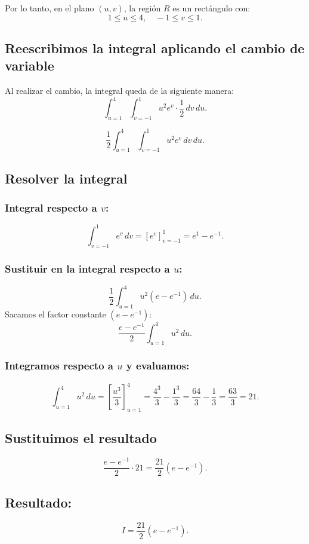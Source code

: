 \documentclass{article}
\begin{document}
Por lo tanto, en el plano \( (u, v) \), la región \( R \) es un rectángulo con:
	\[
	1 \leq u \leq 4, \quad -1 \leq v \leq 1.
	\]
	
	\subsection*{Reescribimos la integral aplicando el cambio de variable}
	Al realizar el cambio, la integral queda de la siguiente manera:
	\[
	 \int_{u=1}^{4} \int_{v=-1}^{1} u^2 e^v \cdot \frac{1}{2} \, dv \, du.
	\]
	
	\[
	 \frac{1}{2} \int_{u=1}^{4} \int_{v=-1}^{1} u^2 e^v \, dv \, du.
	\]
	
	\subsection*{Resolver la integral}
	\subsubsection*{Integral respecto a \( v \):}
	\[
	\int_{v=-1}^1 e^v \, dv = \left[ e^v \right]_{v=-1}^1 = e^1 - e^{-1}.
	\]
	
	\subsubsection*{Sustituir en la integral respecto a \( u \):}
	\[
	 \frac{1}{2} \int_{u=1}^{4} u^2 (e - e^{-1}) \, du.
	\]
	Sacamos el factor constante \( (e - e^{-1}) \):
	\[
	 \frac{e - e^{-1}}{2} \int_{u=1}^{4} u^2 \, du.
	\]
	
	\subsubsection*{Integramos respecto a \( u \) y evaluamos:}
	\[
	\int_{u=1}^{4} u^2 \, du = \left[ \frac{u^3}{3} \right]_{u=1}^{4} = \frac{4^3}{3} - \frac{1^3}{3} = \frac{64}{3} - \frac{1}{3} = \frac{63}{3} = 21.
	\]
	
	\subsection*{Sustituimos el resultado}
	\[
	 \frac{e - e^{-1}}{2} \cdot 21 = \frac{21}{2} (e - e^{-1}).
	\]
	
	\subsection*{Resultado:}
	\[
	\boxed{I = \frac{21}{2} (e - e^{-1})}.
	\]
	
\end{document}
